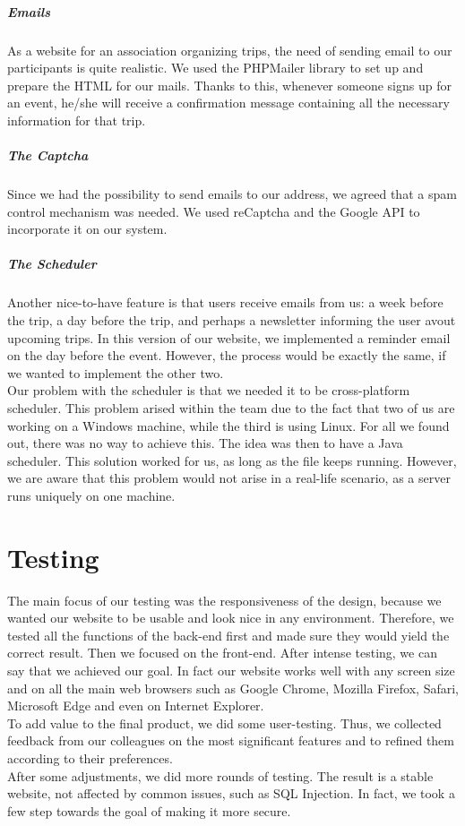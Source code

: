 \documentclass[a4paper]{article}
\begin{document}
	\subparagraph{Emails}
	As a website for an association organizing trips, the need of sending email to our participants is quite realistic. We used the PHPMailer library to set up and prepare the HTML for our mails. Thanks to this, whenever someone signs up for an event, he/she will receive a confirmation message containing all the necessary information for that trip.
	
	\subparagraph{The Captcha}
	Since we had the possibility to send emails to our address, we agreed that a spam control mechanism was needed. We used reCaptcha and the Google API to incorporate it on our system.
	
	\subparagraph{The Scheduler}
	Another nice-to-have feature is that users receive emails from us: a week before the trip, a day before the trip, and perhaps a newsletter informing the user avout upcoming trips. In this version of our website, we implemented a reminder email on the day before the event. However, the process would be exactly the same, if we wanted to implement the other two.\\
	Our problem with the scheduler is that we needed it to be cross-platform scheduler. This problem arised within the team due to the fact that two of us are working on a Windows machine, while the third is using Linux. For all we found out, there was no way to achieve this. The idea was then to have a Java scheduler. This solution worked for us, as long as the file keeps running. However, we are aware that  this problem would not arise in a real-life scenario, as a server runs uniquely on one machine.
	
	\section{Testing}
	The main focus of our testing was the responsiveness of the design, because we wanted our website to be usable and look nice in any environment. Therefore, we tested all the functions of the back-end first and made sure they would yield the correct result. Then we focused on the front-end. After intense testing, we can say that we achieved our goal. In fact our website works well with any screen size and on all the main web browsers such as Google Chrome, Mozilla Firefox, Safari, Microsoft Edge and even on Internet Explorer.\\
	To add value to the final product, we did some user-testing. Thus, we collected feedback from our colleagues on the most significant features and to refined them according to their preferences.\\
	After some adjustments, we did more rounds of testing. The result is a stable website, not affected by common issues, such as SQL Injection. In fact, we took a few step towards the goal of making it more secure.\\
	
\end{document}
